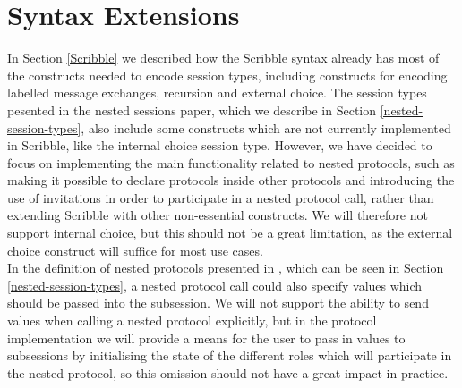 \documentclass[12pt,twoside]{report}
\begin{document}
\section{Syntax Extensions}\label{scribble-extensions}


In Section \ref{Scribble} we described how the Scribble syntax already has most of the constructs needed to encode session types, including constructs for encoding labelled message exchanges, recursion and external choice. The session types pesented in the nested sessions paper\cite{nestedprotocols}, which we describe in Section \ref{nested-session-types}, also include some constructs which are not currently implemented in Scribble, like the internal choice session type. However, we have decided to focus on implementing the main functionality related to nested protocols, such as making it possible to declare protocols inside other protocols and introducing the use of invitations in order to participate in a nested protocol call, rather than extending Scribble with other non-essential constructs. We will therefore not support internal choice, but this should not be a great limitation, as the external choice construct will suffice for most use cases.
\\

In the definition of nested protocols presented in \cite{nestedprotocols}, which can be seen in Section \ref{nested-session-types}, a nested protocol call could also specify values which should be passed into the subsession. We will not support the ability to send values when calling a nested protocol explicitly, but in the protocol implementation we will provide a means for the user to pass in values to subsessions by initialising the state of the different roles which will participate in the nested protocol, so this omission should not have a great impact in practice.\\
\end{document}
